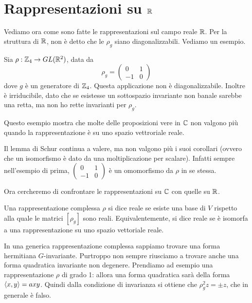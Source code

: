 \section{Rappresentazioni su $\mathbb R$}
	Vediamo ora come sono fatte le rappresentazioni sul campo reale $\mathbb R$. Per la struttura di $\mathbb R$, non è detto che le $\rho_g$ siano diagonalizzabili. Vediamo un esempio.
	
	\begin{myexample}
		Sia $\rho: \mathbb Z_4 \rightarrow GL(\mathbb R^2)$, data da 
			\[
				\rho_g = \left(
					\begin{matrix}
						0 	& 	1 	\\
						-1 	& 	0
					\end{matrix}
				\right)
			\]
		dove $g$ è un generatore di $\mathbb Z_4$. Questa applicazione non è diagonalizzabile. Inoltre è irriducibile, dato che se esistesse un sottospazio invariante non banale sarebbe una retta, ma non ho rette invarianti per $\rho_g$.
	\end{myexample}
	
	Questo esempio mostra che molte delle proposizioni vere in $\mathbb C$ non valgono più quando la rappresentazione è su uno spazio vettroriale reale.
	
	Il lemma di Schur continua a valere, ma non valgono più i suoi corollari (ovvero che un isomorfismo è dato da una moltiplicazione per scalare). Infatti sempre nell'esempio di prima, 
	$
		\left(
			\begin{matrix}
				0 	& 	1 	\\
				-1 	& 	0
			\end{matrix}
		\right)
	$ è un omomorfismo da $\rho$ in se stessa.
	
	Ora cercheremo di confrontare le rappresentazioni su $\mathbb C$ con quelle su $\mathbb R$.
	
	\begin{mydef}
	 Una rappresentazione complessa $\rho$ si dice reale se esiste una base di $V$ rispetto alla quale le matrici $[\rho_g]$ sono reali. Equivalentemente, si dice reale se è isomorfa a una rappresentazione su uno spazio vettoriale reale.
	\end{mydef}

	In una generica rappresentazione complessa sappiamo trovare una forma hermitiana $G$-invariante. Purtroppo non sempre riusciamo a trovare anche una forma quadratica invariante non degenere. Prendiamo ad esempio una rappresentazione $\rho$ di grado 1: allora una forma quadratica sarà della forma $\langle x , y\rangle = axy$. Quindi dalla condizione di invarianza si ottiene che $\rho_g^2 z = \pm z$, che in generale è falso.
	
